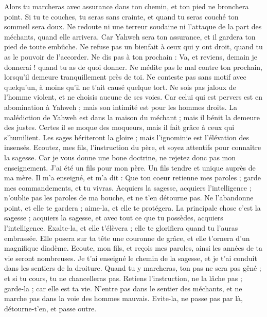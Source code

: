 \begin{multicols}{2}
Alors tu marcheras avec assurance dans ton chemin, et ton pied ne bronchera point.
Si tu te couches, tu seras sans crainte, et quand tu seras couché ton sommeil sera doux.
Ne redoute ni une terreur soudaine ni l’attaque de la part des méchants, quand elle arrivera.
Car Yahweh sera ton assurance, et il gardera ton pied de toute embûche.
Ne refuse pas un bienfait à ceux qui y ont droit, quand tu as le pouvoir de l’accorder.
Ne dis pas à ton prochain : Va, et reviens, demain je donnerai ! quand tu as de quoi donner.
Ne médite pas le mal contre ton prochain, lorsqu’il demeure tranquillement près de toi.
Ne conteste pas sans motif avec quelqu’un, à moins qu'il ne t'ait causé quelque tort.
Ne sois pas jaloux de l'homme violent, et ne choisis aucune de ses voies.
Car celui qui est pervers est en abomination à Yahweh ; mais son intimité est pour les hommes droits.
La malédiction de Yahweh est dans la maison du méchant ; mais il bénit la demeure des justes.
Certes il se moque des moqueurs, mais il fait grâce à ceux qui s’humilient.
Les sages hériteront la gloire ; mais l'ignominie est l’élévation des insensés.
\VerseOne{}Ecoutez, mes fils, l'instruction du père, et soyez attentifs pour connaître la sagesse.
Car je vous donne une bone doctrine, ne rejetez donc pas mon enseignement.
J’ai été un fils pour mon père. Un fils tendre et unique auprès de ma mère.
Il m'a enseigné, et m'a dit : Que ton coeur retienne mes paroles ; garde mes commandements, et tu vivras.
Acquiers la sagesse, acquiers l’intelligence ; n’oublie pas les paroles de ma bouche, et ne t’en détourne pas.
Ne l'abandonne point, et elle te gardera ; aime-la, et elle te protégera.
La principale chose c'est la sagesse ; acquiers la sagesse, et avec tout ce que tu possèdes, acquiers l’intelligence.
Exalte-la, et elle t'élèvera ; elle te glorifiera quand tu l'auras embrassée.
Elle posera sur ta tête une couronne de grâce, et elle t’ornera d’un magnifique diadème.
Ecoute, mon fils, et reçois mes paroles, ainsi les années de ta vie seront nombreuses.
Je t'ai enseigné le chemin de la sagesse, et je t'ai conduit dans les sentiers de la droiture.
Quand tu y marcheras, ton pas ne sera pas gêné ; et si tu cours, tu ne chancelleras pas.
Retiens l'instruction, ne la lâche pas ; garde-la ; car elle est ta vie.
N'entre pas dans le sentier des méchants, et ne marche pas dans la voie des hommes mauvais.
Evite-la, ne passe pas par là, détourne-t'en, et passe outre.

\end{multicols}
